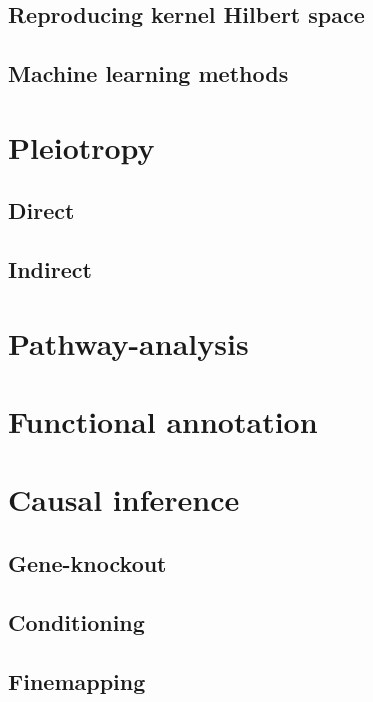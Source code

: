 \documentclass[]{book}
\theoremstyle{definition}
\theoremstyle{definition}
\theoremstyle{definition}
\theoremstyle{remark}
\begin{document}
\section{Reproducing kernel Hilbert
space}\label{reproducing-kernel-hilbert-space}

\section{Machine learning methods}\label{machine-learning-methods}

\chapter{Pleiotropy}\label{pleiotropy}

\section{Direct}\label{direct}

\section{Indirect}\label{indirect}

\chapter{Pathway-analysis}\label{pathway-analysis}

\chapter{Functional annotation}\label{functional-annotation}

\chapter{Causal inference}\label{causal-inference}

\section{Gene-knockout}\label{gene-knockout}

\section{Conditioning}\label{conditioning}

\section{Finemapping}\label{finemapping}
\end{document}
